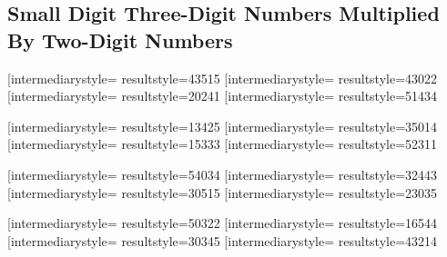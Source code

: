 \documentclass[letterpaper, 17pt]{article}
\newcommand{\white}[1]{}
\begin{document}
\begin{center}
	\section*{Small Digit Three-Digit Numbers Multiplied By Two-Digit Numbers}

	\vspace{0.3in}

	\opmul[intermediarystyle=\white, resultstyle=\white]{435}{15}\qquad
	\opmul[intermediarystyle=\white, resultstyle=\white]{430}{22}\qquad
	\opmul[intermediarystyle=\white, resultstyle=\white]{202}{41}\qquad
	\opmul[intermediarystyle=\white, resultstyle=\white]{514}{34}\qquad

	\vspace{0.5in}

	\opmul[intermediarystyle=\white, resultstyle=\white]{134}{25}\qquad
	\opmul[intermediarystyle=\white, resultstyle=\white]{350}{14}\qquad
	\opmul[intermediarystyle=\white, resultstyle=\white]{153}{33}\qquad
	\opmul[intermediarystyle=\white, resultstyle=\white]{523}{11}\qquad

	\vspace{0.5in}

	\opmul[intermediarystyle=\white, resultstyle=\white]{540}{34}\qquad
	\opmul[intermediarystyle=\white, resultstyle=\white]{324}{43}\qquad
	\opmul[intermediarystyle=\white, resultstyle=\white]{305}{15}\qquad
	\opmul[intermediarystyle=\white, resultstyle=\white]{230}{35}\qquad

	\vspace{0.5in}

	\opmul[intermediarystyle=\white, resultstyle=\white]{503}{22}\qquad
	\opmul[intermediarystyle=\white, resultstyle=\white]{165}{44}\qquad
	\opmul[intermediarystyle=\white, resultstyle=\white]{303}{45}\qquad
	\opmul[intermediarystyle=\white, resultstyle=\white]{432}{14}\qquad

\end{center}
\end{document}
